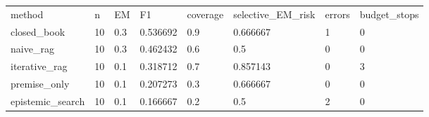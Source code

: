 \begin{tabular}{llllllll}
\hline
method & n & EM & F1 & coverage & selective\_EM\_risk & errors & budget\_stops \\
closed\_book & 10 & 0.3 & 0.536692 & 0.9 & 0.666667 & 1 & 0 \\
naive\_rag & 10 & 0.3 & 0.462432 & 0.6 & 0.5 & 0 & 0 \\
iterative\_rag & 10 & 0.1 & 0.318712 & 0.7 & 0.857143 & 0 & 3 \\
premise\_only & 10 & 0.1 & 0.207273 & 0.3 & 0.666667 & 0 & 0 \\
epistemic\_search & 10 & 0.1 & 0.166667 & 0.2 & 0.5 & 2 & 0 \\
\hline
\end{tabular}
